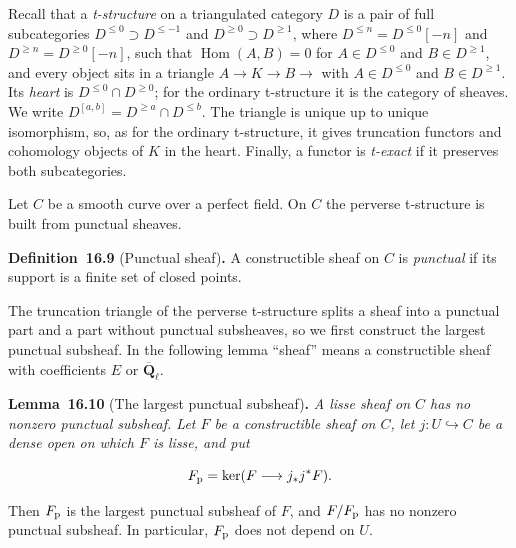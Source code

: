 \documentclass[11pt]{article}
\newenvironment{bpstatement}[2]{\par\addvspace{0.6\baselineskip}\noindent\textbf{#1}#2\textbf{.}\enspace\ignorespaces}
  {\par\addvspace{0.4\baselineskip}}
\newenvironment{bpstatementit}[2]{\begin{bpstatement}{#1}{#2}\itshape\ignorespaces}{\end{bpstatement}}
\providecommand{\Hom}{}\renewcommand{\Hom}{\operatorname{Hom}}
\begin{document}
Recall that a \emph{t-structure} on a triangulated category \(D\) is a pair of full subcategories \(D^{\le0}\supset D^{\le-1}\) and \(D^{\ge0}\supset D^{\ge1}\), where \(D^{\le n}=D^{\le0}[-n]\) and \(D^{\ge n}=D^{\ge0}[-n]\), such that \(\Hom(A,B)=0\) for \(A\in D^{\le0}\) and \(B\in D^{\ge1}\), and every object sits in a triangle \(A\to K\to
B\to\) with \(A\in D^{\le0}\) and \(B\in D^{\ge1}\). Its \emph{heart} is \(D^{\le0}\cap D^{\ge0}\); for the ordinary t-structure it is the category of sheaves. We write \(D^{[a,b]}=D^{\ge a}\cap D^{\le b}\). The triangle is unique up to unique isomorphism, so, as for the ordinary t-structure, it gives truncation functors and cohomology objects of \(K\) in the heart. Finally, a functor is \emph{t-exact} if it preserves both subcategories.

Let \(C\) be a smooth curve over a perfect field. On \(C\) the perverse t-structure is built from punctual sheaves.

\label{bp197}%
\begin{bpstatement}{Definition~16.9}{ (Punctual sheaf)}
A constructible sheaf on \(C\) is \emph{punctual} if its support is a finite set of closed points.
\end{bpstatement}

\label{bp198}%
The truncation triangle of the perverse t-structure splits a sheaf into a punctual part and a part without punctual subsheaves, so we first construct the largest punctual subsheaf. In the following lemma “sheaf” means a constructible sheaf with coefficients \(E\) or \(\overline{\mathbf Q}_\ell\).

\label{bp199}%
\begin{bpstatementit}{Lemma~16.10}{ (The largest punctual subsheaf)}
A lisse sheaf on \(C\) has no nonzero punctual subsheaf. Let \(F\) be a constructible sheaf on \(C\), let \(j:U\hookrightarrow C\) be a dense open on which \(F\) is lisse, and put

\[
F_{\rm p}=\ker(F\longrightarrow j_*j^*F).
\]

Then \(F_{\rm p}\) is the largest punctual subsheaf of \(F\), and \(F/F_{\rm p}\) has no nonzero punctual subsheaf. In particular, \(F_{\rm p}\) does not depend on \(U\).
\end{bpstatementit}
\end{document}
